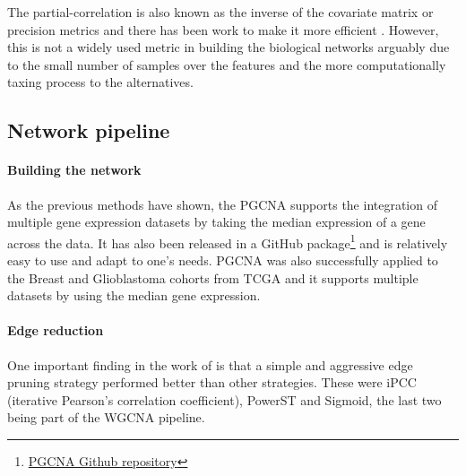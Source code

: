 The partial-correlation is also known as the inverse of the covariate matrix or precision metrics and there has been work to make it more efficient \citep{Ghanbari2019-tq}. However, this is not a widely used metric in building the biological networks arguably due to the small number of samples over the features and the more computationally taxing process to the alternatives.

\subsection{Network pipeline}

\vspace{3mm}
\vspace{3mm}

\paragraph*{Building the network} 

As the previous methods have shown, the PGCNA supports the integration of multiple gene expression datasets by taking the median expression of a gene across the data. It has also been released in a GitHub package\footnote{\href{https://github.com/medmaca/PGCNA}{PGCNA Github repository}} and is relatively easy to use and adapt to one's needs. PGCNA was also successfully applied to the Breast and Glioblastoma cohorts from TCGA and it supports multiple datasets by using the median gene expression.

\paragraph*{Edge reduction}

One important finding in the work of \citet{Care2019-ij} is that a simple and aggressive edge pruning strategy performed better than other strategies. These were iPCC (iterative Pearson’s correlation coefficient), PowerST and Sigmoid, the last two being part of the WGCNA pipeline.

